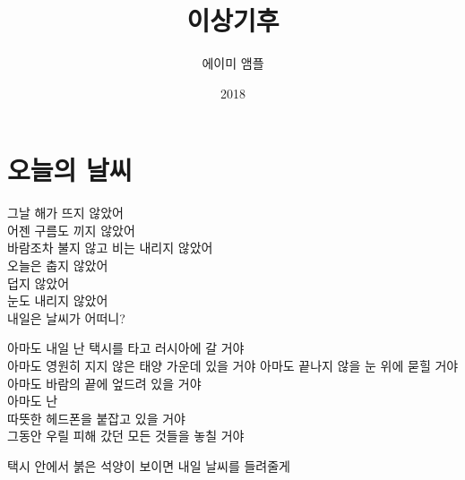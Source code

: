 \documentclass[12pt, b6paper, openany]{memoir}
\title{이상기후}
\author{에이미 앰플}
\date{2018}
\newenvironment{lyric}{\setlength{\parindent}{0pt}}{}
\begin{document}
\frontmatter
\begin{titlingpage}
\maketitle
\end{titlingpage}
  \tableofcontents
  
\mainmatter
\begin{lyric}
\hypertarget{uxc624uxb298uxc758-uxb0a0uxc528}{%
\chapter{오늘의 날씨}\label{uxc624uxb298uxc758-uxb0a0uxc528}}

그날 해가 뜨지 않았어\\
어젠 구름도 끼지 않았어\\
바람조차 불지 않고 비는 내리지 않았어\\
오늘은 춥지 않았어\\
덥지 않았어\\
눈도 내리지 않았어\\
내일은 날씨가 어떠니?

아마도 내일 난 택시를 타고 러시아에 갈 거야\\
아마도 영원히 지지 않은 태양 가운데 있을 거야 아마도 끝나지 않을 눈 위에 묻힐 거야\\
아마도 바람의 끝에 엎드려 있을 거야\\
아마도 난\\
따뜻한 헤드폰을 붙잡고 있을 거야\\
그동안 우릴 피해 갔던 모든 것들을 놓칠 거야

택시 안에서 붉은 석양이 보이면 내일 날씨를 들려줄게
\end{lyric}
\end{document}
